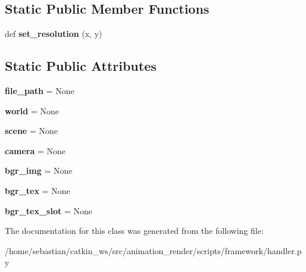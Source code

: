 \subsection*{Static Public Member Functions}
\begin{DoxyCompactItemize}
\item 
def {\bfseries set\+\_\+resolution} (x, y)\hypertarget{classframework_1_1handler_1_1BlenderHandler_abfb34ad8570c3b190aa7d0010174e17f}{}\label{classframework_1_1handler_1_1BlenderHandler_abfb34ad8570c3b190aa7d0010174e17f}

\end{DoxyCompactItemize}
\subsection*{Static Public Attributes}
\begin{DoxyCompactItemize}
\item 
{\bfseries file\+\_\+path} = None\hypertarget{classframework_1_1handler_1_1BlenderHandler_ac64148d881bc152a0e378e25529db11c}{}\label{classframework_1_1handler_1_1BlenderHandler_ac64148d881bc152a0e378e25529db11c}

\item 
{\bfseries world} = None\hypertarget{classframework_1_1handler_1_1BlenderHandler_a416cfd48d0e660438a8c3c258cebb5b8}{}\label{classframework_1_1handler_1_1BlenderHandler_a416cfd48d0e660438a8c3c258cebb5b8}

\item 
{\bfseries scene} = None\hypertarget{classframework_1_1handler_1_1BlenderHandler_a300781bdf7564687a54e0c0a441e72d8}{}\label{classframework_1_1handler_1_1BlenderHandler_a300781bdf7564687a54e0c0a441e72d8}

\item 
{\bfseries camera} = None\hypertarget{classframework_1_1handler_1_1BlenderHandler_a42cc53178c79726a87a2107d7318f8f0}{}\label{classframework_1_1handler_1_1BlenderHandler_a42cc53178c79726a87a2107d7318f8f0}

\item 
{\bfseries bgr\+\_\+img} = None\hypertarget{classframework_1_1handler_1_1BlenderHandler_a887c45867c4ad1dd00a0b1a3ad996d05}{}\label{classframework_1_1handler_1_1BlenderHandler_a887c45867c4ad1dd00a0b1a3ad996d05}

\item 
{\bfseries bgr\+\_\+tex} = None\hypertarget{classframework_1_1handler_1_1BlenderHandler_a23b723c2fa0081e00ef802a7af201861}{}\label{classframework_1_1handler_1_1BlenderHandler_a23b723c2fa0081e00ef802a7af201861}

\item 
{\bfseries bgr\+\_\+tex\+\_\+slot} = None\hypertarget{classframework_1_1handler_1_1BlenderHandler_a39c8cdffeeb9d4f5f07b502ddaa3d2d0}{}\label{classframework_1_1handler_1_1BlenderHandler_a39c8cdffeeb9d4f5f07b502ddaa3d2d0}

\end{DoxyCompactItemize}


The documentation for this class was generated from the following file\+:\begin{DoxyCompactItemize}
\item 
/home/sebastian/catkin\+\_\+ws/src/animation\+\_\+render/scripts/framework/handler.\+py\end{DoxyCompactItemize}
